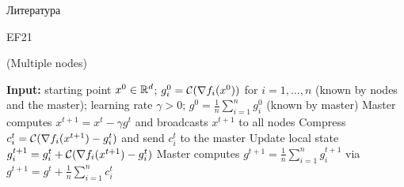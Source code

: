 \documentclass{beamer}
\begin{document}
\begin{frame}{Литература}
    \small
    
    \nocite{richtarik2021ef21,de2000multilinear,beznosikov2023biased}
    
\end{frame}
\begin{frame}{EF21}
    \begin{algorithm}[H]
        \small
        \centering
        \caption{ (Multiple nodes)}\label{alg:EF21}
        \begin{algorithmic}[1]
            \State \textbf{Input:} starting point $x^{0} \in \mathbb{R}^d$;  $g_i^0 = \mathcal{C}(\nabla f_i(x^0))$ for $i=1,\dots, n$ (known by nodes and the master); learning rate $\gamma>0$; $g^0 = \frac{1}{n}\sum_{i=1}^n g_i^0$ (known by master)
            \State Master computes $x^{t+1} = x^t - \gamma g^t$ and broadcasts $x^{t+1}$ to all nodes
            \State Compress $c_i^t = \mathcal{C}(\nabla f_i(x^{t+1}) - g_i^t)$ and send $c_i^t $ to the master
            \State Update local state $g_i^{t+1} = g_i^t + \mathcal{C}( \nabla f_i(x^{t+1}) - g_i^t)$
            \EndFor
            \State Master computes $g^{t+1} = \frac{1}{n} \sum_{i=1}^n  g_i^{t+1}$ via  $g^{t+1} = g^t + \frac{1}{n} \sum_{i=1}^n c_i^t $
            \EndFor
        \end{algorithmic}
    \end{algorithm}
    \cite{richtarik2021ef21}
\end{frame}
\end{document}
